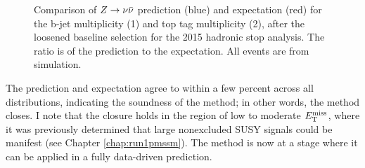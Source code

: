 \begin{figure}[tb!]
\centering
{}
\caption{Comparison of $Z\rightarrow \nu\bar{\nu}$ prediction (blue) and expectation (red) for the b-jet multiplicity (1) and top tag multiplicity (2), after the loosened baseline selection for the 2015 hadronic stop analysis. The ratio is of the prediction to the expectation. All events are from simulation.}
\label{fig:ZInvCR_NbNt}
\end{figure}
\noindent
The prediction and expectation agree to within a few percent across all distributions, indicating the soundness of the method; in other words, the method closes. I note that the closure holds in the region of low to moderate $E_{\text{T}}^{\rm miss}$, where it was previously determined that large nonexcluded SUSY signals could be manifest (see Chapter \ref{chap:run1pmssm}). The method is now at a stage where it can be applied in a fully data-driven prediction. 

